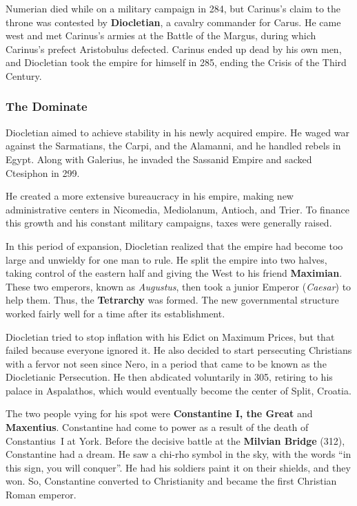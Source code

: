 Numerian died while on a military campaign in 284,
but Carinus's claim to the throne was contested by \textbf{Diocletian},
a cavalry commander for Carus.
He came west and met Carinus's armies at the Battle of the Margus,
during which Carinus's prefect Aristobulus defected.
Carinus ended up dead by his own men,
and Diocletian took the empire for himself in 285,
ending the Crisis of the Third Century.

\subsubsection*{The Dominate}

Diocletian aimed to achieve stability in his newly acquired empire.
He waged war against the Sarmatians, the Carpi, and the Alamanni,
and he handled rebels in Egypt.
Along with Galerius, he invaded the Sassanid Empire and sacked Ctesiphon in 299.

He created a more extensive bureaucracy in his empire,
making new administrative centers in Nicomedia, Mediolanum, Antioch, and Trier.
To finance this growth and his constant military campaigns,
taxes were generally raised.

In this period of expansion,
Diocletian realized that the empire had become too large and unwieldy for one man to rule.
He split the empire into two halves,
taking control of the eastern half and giving the West to his friend \textbf{Maximian}.
These two emperors, known as \textit{Augustus},
then took a junior Emperor (\textit{Caesar}) to help them.
Thus, the \textbf{Tetrarchy} was formed.
The new governmental structure worked fairly well for a time after its establishment.

Diocletian tried to stop inflation with his Edict on Maximum Prices,
but that failed because everyone ignored it.
He also decided to start persecuting Christians with a fervor not seen since Nero,
in a period that came to be known as the Diocletianic Persecution.
He then abdicated voluntarily in 305,
retiring to his palace in Aspalathos, which would eventually become the center of Split, Croatia.

The two people vying for his spot were \textbf{Constantine I, the Great} and \textbf{Maxentius}.
Constantine had come to power as a result of the death of Constantius~I at York.
Before the decisive battle at the \textbf{Milvian Bridge} (312), Constantine had a dream.
He saw a chi-rho symbol in the sky, with the words ``in this sign, you will conquer''.
He had his soldiers paint it on their shields, and they won.
So, Constantine converted to Christianity and became the first Christian Roman emperor.

